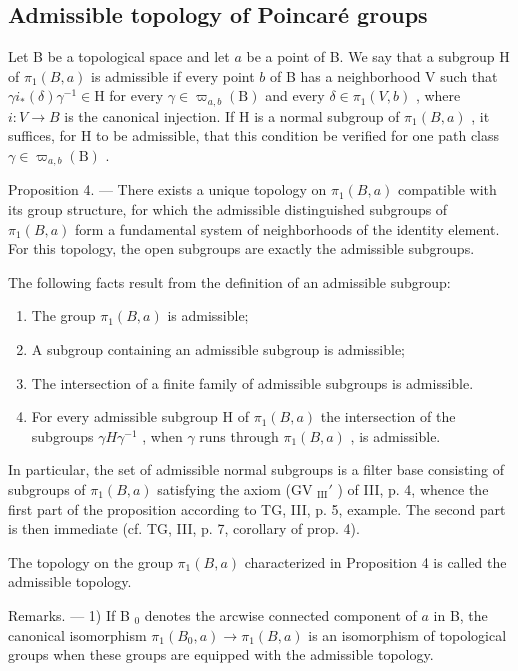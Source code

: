 \subsection{Admissible topology of Poincaré groups}

Let B be a topological space and let \(a\) be a point of B. We say that a subgroup H of \(\pi_1(B, a)\) is admissible if every point \(b\) of B has a neighborhood V such that \(\gamma i_*(\delta)\gamma^{-1} \in \mathrm{H}\) for every \(\gamma \in \varpi_{a,b}(\mathrm{B})\) and every \(\delta \in \pi_1(V, b)\) , where \(i: V \to B\) is the canonical injection. If H is a normal subgroup of \(\pi_1(B, a)\) , it suffices, for H to be admissible, that this condition be verified for one path class \(\gamma \in \varpi_{a,b}(\mathrm{B})\) .

Proposition 4. — There exists a unique topology on \(\pi_1(B, a)\) compatible with its group structure, for which the admissible distinguished subgroups of \(\pi_1(B, a)\) form a fundamental system of neighborhoods of the identity element. For this topology, the open subgroups are exactly the admissible subgroups.

The following facts result from the definition of an admissible subgroup:

\begin{enumerate}
\def\labelenumi{\alph{enumi})}
\item
  The group \(\pi_1(B, a)\) is admissible;
\item
  A subgroup containing an admissible subgroup is admissible;
\item
  The intersection of a finite family of admissible subgroups is admissible.
\item
  For every admissible subgroup H of \(\pi_{1}(B,a)\) the intersection of the subgroups \(\gamma H\gamma^{-1}\) , when \(\gamma\) runs through \(\pi_{1}(B,a)\) , is admissible.
\end{enumerate}

In particular, the set of admissible normal subgroups is a filter base consisting of subgroups of \(\pi_1(B,a)\) satisfying the axiom (GV \(_{\text{III}}'\) ) of III, p. 4, whence the first part of the proposition according to TG, III, p. 5, example. The second part is then immediate (cf. TG, III, p. 7, corollary of prop. 4).

The topology on the group \(\pi_{1}(B,a)\) characterized in Proposition 4 is called the admissible topology.

Remarks. --- 1) If B \(_{0}\) denotes the arcwise connected component of \(a\) in B, the canonical isomorphism \(\pi_{1}(B_{0}, a) \to \pi_{1}(B, a)\) is an isomorphism of topological groups when these groups are equipped with the admissible topology.

